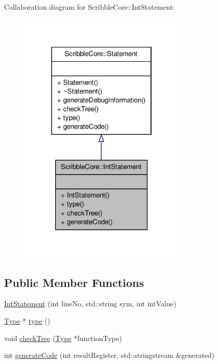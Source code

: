 Collaboration diagram for Scribble\-Core\-:\-:Int\-Statement\-:
\nopagebreak
\begin{figure}[H]
\begin{center}
\leavevmode
\includegraphics[width=226pt]{class_scribble_core_1_1_int_statement__coll__graph}
\end{center}
\end{figure}
\subsection*{Public Member Functions}
\begin{DoxyCompactItemize}
\item 
\hyperlink{class_scribble_core_1_1_int_statement_a275f9984bf4feb27e7735edc8cbbbcbe}{Int\-Statement} (int line\-No, std\-::string sym, int int\-Value)
\item 
\hyperlink{class_scribble_core_1_1_type}{Type} $\ast$ \hyperlink{class_scribble_core_1_1_int_statement_a2540aa15838b2a60ca2dbd943a342e83}{type} ()
\item 
void \hyperlink{class_scribble_core_1_1_int_statement_afad23b037601e53524726f56b97c4fab}{check\-Tree} (\hyperlink{class_scribble_core_1_1_type}{Type} $\ast$function\-Type)
\item 
int \hyperlink{class_scribble_core_1_1_int_statement_a8705897a8243888d434b1cc658f5a92e}{generate\-Code} (int result\-Register, std\-::stringstream \&generated)
\end{DoxyCompactItemize}


